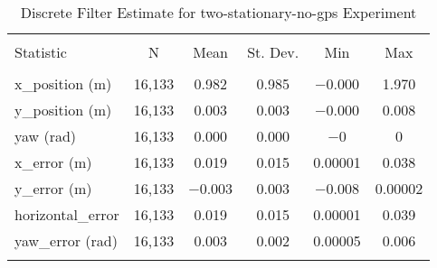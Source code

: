 
\begin{table}[h] \centering 
  \caption{Discrete Filter Estimate for two-stationary-no-gps Experiment} 
  \label{tab:two_stationary_no_gps_discrete_summary} 
\begin{tabular}{@{\extracolsep{5pt}}lccccc} 
\\[-1.8ex]\hline 
\hline \\[-1.8ex] 
Statistic & \multicolumn{1}{c}{N} & \multicolumn{1}{c}{Mean} & \multicolumn{1}{c}{St. Dev.} & \multicolumn{1}{c}{Min} & \multicolumn{1}{c}{Max} \\ 
\hline \\[-1.8ex] 
x\_position (m) & 16,133 & \num{0.982} & \num{0.985} & \num{-0.000} & \num{1.970} \\ 
y\_position (m) & 16,133 & \num{0.003} & \num{0.003} & \num{-0.000} & \num{0.008} \\ 
yaw (rad) & 16,133 & \num{0.000} & \num{0.000} & $-$0 & 0 \\ 
x\_error (m) & 16,133 & \num{0.019} & \num{0.015} & \num{0.00001} & \num{0.038} \\ 
y\_error (m) & 16,133 & \num{-0.003} & \num{0.003} & \num{-0.008} & \num{0.00002} \\ 
horizontal\_error & 16,133 & \num{0.019} & \num{0.015} & \num{0.00001} & \num{0.039} \\ 
yaw\_error (rad) & 16,133 & \num{0.003} & \num{0.002} & \num{0.00005} & \num{0.006} \\ 
\hline \\[-1.8ex] 
\end{tabular} 
\end{table} 
